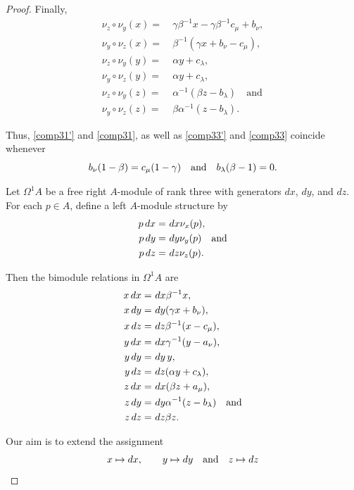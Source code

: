 \documentclass{amsart}
\theoremstyle{definition}
\theoremstyle{remark}
\numberwithin{equation}{section}
\begin{document}
\begin{proof}
Finally, 
\begin{align}
    \nu_{z} \circ \nu_{y}(x) = &\ \gamma\beta^{-1}x-\gamma\beta^{-1}c_{\mu}+b_{\nu}, \label{comp31'} \\
    \nu_{y} \circ \nu_{z}(x) = &\ \beta^{-1}(\gamma x+b_{\nu}-c_{\mu}), \label{comp31} \\
    \nu_{z} \circ \nu_{y}(y) = &\ \alpha y+c_{\lambda}, \label{comp32'} \\
    \nu_{y} \circ \nu_{z}(y) = &\ \alpha y+c_{\lambda},  \label{comp32} \\
    \nu_{z} \circ \nu_{y}(z) = &\ \alpha^{-1}(\beta z-b_{\lambda})  \quad \text{and} \label{comp33'}\\
    \nu_{y} \circ \nu_{z}(z) = &\ \beta\alpha^{-1}(z-b_{\lambda}). \label{comp33}
\end{align}

Thus, \eqref{comp31'} and \eqref{comp31}, as well as \eqref{comp33'} and \eqref{comp33}  coincide whenever
$$
b_{\nu}(1-\beta)=c_{\mu}(1-\gamma) \quad {\rm and} \quad b_{\lambda}(\beta-1) = 0.
$$

Let $\Omega^{1}A$ be a free right $A$-module of rank three with generators $dx$, $dy$, and $dz$. For each $p\in A$, define a left $A$-module structure by
\begin{align}
    p\,dx = &\ dx \nu_{x}(p), \notag \\ 
    p\,dy = &\ dy\nu_{y}(p)\quad  \text{and} \notag \\
    p\,dz = &\ dz\nu_{z}(p). \label{relrightmod}
\end{align}

Then the bimodule relations in $\Omega^{1}A$ are
\begin{align}
x\,dx = &\ dx \beta^{-1}x, \notag \\
x\,dy = &\ dy(\gamma x+b_{\nu}), \notag \\
x\,dz = &\ dz\beta^{-1}(x-c_{\mu}), \label{rel1} \\
y\,dx = &\ dx\gamma^{-1}(y-a_{\nu}), \notag \\  
y\,dy = &\ dy\,y, \notag \\
y\,dz = &\ dz(\alpha y+c_{\lambda}), \label{rel2} \\
z\,dx = &\ dx(\beta z+a_{\mu}), \notag \\
z\,dy = &\ dy\alpha^{-1}(z-b_{\lambda}) \quad \text{and} \notag \\
z\,dz = &\ dz\beta z. \label{rel3} 
\end{align}

Our aim is to extend the assignment
\[
x \mapsto dx, \qquad y \mapsto dy  \quad {\rm and} \quad z\mapsto dz
\]


\end{proof}
\end{document}
